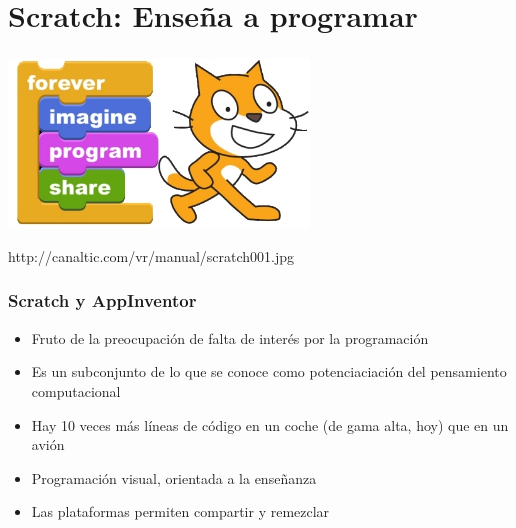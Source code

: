 \section{Scratch: Enseña a programar}




\begin{frame}
\frametitle{}

\begin{center}
  \includegraphics[width=8cm]{figs/scratch.jpg}
\end{center}


\begin{flushright}
{\tiny
http://canaltic.com/vr/manual/scratch001.jpg
}
\end{flushright}

\end{frame}



\begin{frame}
\frametitle{Scratch y AppInventor}

\begin{itemize}
   \item Fruto de la preocupación de falta de interés por la programación
   \item Es un subconjunto de lo que se conoce como potenciaciación del pensamiento computacional
   \item Hay 10 veces más líneas de código en un coche (de gama alta, hoy) que en un avión
   \item Programación visual, orientada a la enseñanza
   \item Las plataformas permiten compartir y remezclar
\end{itemize}

\end{frame}



